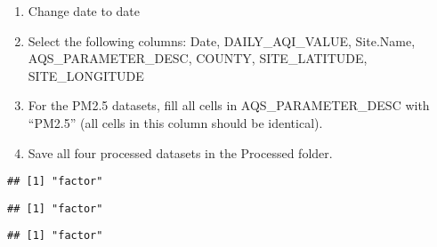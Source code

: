 \documentclass[]{article}
\newenvironment{Shaded}{\begin{snugshade}}{\end{snugshade}}
\newcommand{\KeywordTok}[1]{\textcolor[rgb]{0.13,0.29,0.53}{\textbf{#1}}}
\newcommand{\DecValTok}[1]{\textcolor[rgb]{0.00,0.00,0.81}{#1}}
\newcommand{\CommentTok}[1]{\textcolor[rgb]{0.56,0.35,0.01}{\textit{#1}}}
\newcommand{\OperatorTok}[1]{\textcolor[rgb]{0.81,0.36,0.00}{\textbf{#1}}}
\newcommand{\NormalTok}[1]{#1}
\providecommand{\tightlist}{%
  \setlength{\itemsep}{0pt}\setlength{\parskip}{0pt}}
\begin{document}
\begin{enumerate}
\def\labelenumi{\arabic{enumi}.}
\setcounter{enumi}{2}
\tightlist
\item
  Change date to date
\item
  Select the following columns: Date, DAILY\_AQI\_VALUE, Site.Name,
  AQS\_PARAMETER\_DESC, COUNTY, SITE\_LATITUDE, SITE\_LONGITUDE
\item
  For the PM2.5 datasets, fill all cells in AQS\_PARAMETER\_DESC with
  ``PM2.5'' (all cells in this column should be identical).
\item
  Save all four processed datasets in the Processed folder.
\end{enumerate}

\begin{Shaded}
\end{Shaded}

\begin{verbatim}
## [1] "factor"
\end{verbatim}

\begin{Shaded}
\end{Shaded}

\begin{verbatim}
## [1] "factor"
\end{verbatim}

\begin{Shaded}
\end{Shaded}

\begin{verbatim}
## [1] "factor"
\end{verbatim}

\begin{Shaded}
\end{Shaded}
\end{document}
